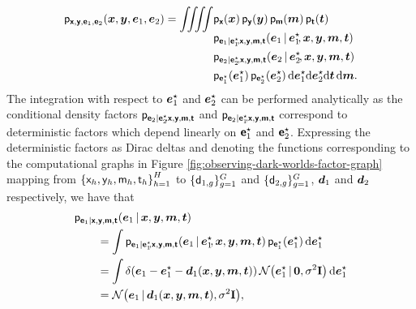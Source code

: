 \begin{equation}\label{eq:odw-e1-e2-x-y-joint-1}
\begin{split}
  \mathsf{p}_{\boldsymbol{\mathsf{x}}, \boldsymbol{\mathsf{y}}, \boldsymbol{\mathsf{e}}_1,\boldsymbol{\mathsf{e}}_2}(\boldsymbol{x},\boldsymbol{y},\boldsymbol{e}_1,\boldsymbol{e}_2) =
  \iiiint &
    \mathsf{p}_{\boldsymbol{\mathsf{x}}}(\boldsymbol{x}) \, 
    \mathsf{p}_{\boldsymbol{\mathsf{y}}}(\boldsymbol{y}) \, 
    \mathsf{p}_{\boldsymbol{\mathsf{m}}}(\boldsymbol{m}) \,
    \mathsf{p}_{\boldsymbol{\mathsf{t}}}(\boldsymbol{t}) \,
    \\[-1.5mm]& 
    \mathsf{p}_{\boldsymbol{\mathsf{e}}_1 | \boldsymbol{\mathsf{e}}_1^\star\kern-2pt,\boldsymbol{\mathsf{x}},\boldsymbol{\mathsf{y}},\boldsymbol{\mathsf{m}},\boldsymbol{\mathsf{t}}}
    (\boldsymbol{e}_1\operatorname{|}\boldsymbol{e}_1^\star\kern-2pt,\boldsymbol{x},\boldsymbol{y},\boldsymbol{m},\boldsymbol{t})\,
    \\&    
    \mathsf{p}_{\boldsymbol{\mathsf{e}}_2 | \boldsymbol{\mathsf{e}}_2^\star\kern-1.5pt,\boldsymbol{\mathsf{x}},\boldsymbol{\mathsf{y}},\boldsymbol{\mathsf{m}},\boldsymbol{\mathsf{t}}}
    (\boldsymbol{e}_2\operatorname{|}\boldsymbol{e}_2^\star\kern-1.5pt,\boldsymbol{x},\boldsymbol{y},\boldsymbol{m},\boldsymbol{t})\,
    \\&
    \mathsf{p}_{\boldsymbol{\mathsf{e}}_1^\star}(\boldsymbol{e}_1^\star) \, 
    \mathsf{p}_{\boldsymbol{\mathsf{e}}_2^\star}(\boldsymbol{e}_2^\star) \,
    \mathrm{d}\boldsymbol{e}_1^\star\mathrm{d}\boldsymbol{e}_2^\star\mathrm{d}\boldsymbol{t}\,\mathrm{d}\boldsymbol{m}.
\end{split}
\end{equation}
The integration with respect to $\boldsymbol{e}_1^\star$ and $\boldsymbol{e}_2^\star$ can be performed analytically as the conditional density factors $\mathsf{p}_{\boldsymbol{\mathsf{e}}_2 | \boldsymbol{\mathsf{e}}_2^\star\kern-2pt,\boldsymbol{\mathsf{x}},\boldsymbol{\mathsf{y}},\boldsymbol{\mathsf{m}},\boldsymbol{\mathsf{t}}}$ and $\mathsf{p}_{\boldsymbol{\mathsf{e}}_2 | \boldsymbol{\mathsf{e}}_1^\star\kern-2pt,\boldsymbol{\mathsf{x}},\boldsymbol{\mathsf{y}},\boldsymbol{\mathsf{m}},\boldsymbol{\mathsf{t}}}$ correspond to deterministic factors which depend linearly on $\boldsymbol{\mathsf{e}}_1^\star$ and $\boldsymbol{\mathsf{e}}_2^\star$. Expressing the deterministic factors as Dirac deltas and denoting the functions corresponding to the computational graphs in Figure \ref{fig:observing-dark-worlds-factor-graph} mapping from $\fset{\rvar{x}_h,\rvar{y}_h,\rvar{m}_h,\rvar{t}_h}_{h=1}^H$ to $\lbrace \mathsf{d}_{1,g}\rbrace_{g=1}^G$ and $\lbrace \mathsf{d}_{2,g} \rbrace_{g=1}^G$, $\boldsymbol{d}_1$ and $\boldsymbol{d}_2$ respectively, we have that
\begin{equation}\label{eq:odw-e1-gvn-xymt}
\begin{split}
  &\pden{\rvct{e}_1 | \rvct{x},\rvct{y},\rvct{m},\rvct{t}} (\vct{e}_1\gvn\vct{x},\vct{y},\vct{m},\vct{t})
  \\
  &\qquad=
  \int 
    \pden{\rvct{e}_1 | \rvct{e}_1^\star\kern-2pt,\rvct{x},\rvct{y},\rvct{m},\rvct{t}}
    (\vct{e}_1\gvn\vct{e}_1^\star\kern-2pt,\vct{x},\vct{y},\vct{m},\vct{t})\,
    \pden{\rvct{e}^\star_1}(\vct{e}^\star_1)
  \,\dr\vct{e}^\star_1 
  \\
  &\qquad=
  \int 
    \delta\lpa
     \vct{e}_1 - \vct{e}^\star_1 - \vct{d}_1(\vct{x},\vct{y},\vct{m},\vct{t})
    \rpa\,
    \nrm{\vct{e}^\star_1 \gvn \vct{0},\sigma^2\idmtx}
  \,\dr\vct{e}^\star_1\\
  &\qquad=
  \nrm{\vct{e}_1 \gvn \vct{d}_1(\vct{x},\vct{y},\vct{m},\vct{t}),\sigma^2\idmtx},
\end{split}
\end{equation}
